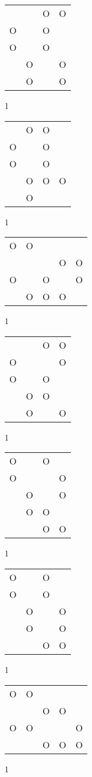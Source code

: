 \begin{tabular}{|m{0.2cm}m{0.2cm}m{0.2cm}m{0.2cm}|}\hline
 & &O&O\\
O& &O& \\
O& &O& \\
 &O& &O\\
 &O& &O\\
\hline\end{tabular}1
\begin{tabular}{|m{0.2cm}m{0.2cm}m{0.2cm}m{0.2cm}|}\hline
 &O&O& \\
O& &O& \\
O& &O& \\
 &O&O&O\\
 &O& & \\
\hline\end{tabular}1
\begin{tabular}{|m{0.2cm}m{0.2cm}m{0.2cm}m{0.2cm}m{0.2cm}|}\hline
O&O& & & \\
 & & &O&O\\
O& &O& &O\\
 &O&O&O& \\
\hline\end{tabular}1
\begin{tabular}{|m{0.2cm}m{0.2cm}m{0.2cm}m{0.2cm}|}\hline
 & &O&O\\
O& & &O\\
O& &O& \\
 &O&O& \\
 &O& &O\\
\hline\end{tabular}1
\begin{tabular}{|m{0.2cm}m{0.2cm}m{0.2cm}m{0.2cm}|}\hline
O& &O& \\
O& & &O\\
 &O& &O\\
 &O&O& \\
 & &O&O\\
\hline\end{tabular}1
\begin{tabular}{|m{0.2cm}m{0.2cm}m{0.2cm}m{0.2cm}|}\hline
O& &O& \\
O& &O& \\
 &O& &O\\
 &O& &O\\
 & &O&O\\
\hline\end{tabular}1
\begin{tabular}{|m{0.2cm}m{0.2cm}m{0.2cm}m{0.2cm}m{0.2cm}|}\hline
O&O& & & \\
 & &O&O& \\
O&O& & &O\\
 & &O&O&O\\
\hline\end{tabular}1
